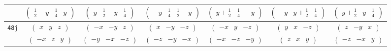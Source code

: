 \documentclass[fleqn,9pt,landscape]{jsarticle}
\begin{document}
\begin{center}
\begin{longtable}{ccccccc}
& $ \begin{pmatrix} \frac{1}{2} - y & \frac{1}{4} & y \end{pmatrix} $ & $ \begin{pmatrix} y & \frac{1}{2} - y & \frac{1}{4} \end{pmatrix} $ & $ \begin{pmatrix} - y & \frac{1}{4} & \frac{1}{2} - y \end{pmatrix} $ & $ \begin{pmatrix} y + \frac{1}{2} & \frac{1}{4} & - y \end{pmatrix} $ & $ \begin{pmatrix} - y & y + \frac{1}{2} & \frac{1}{4} \end{pmatrix} $ & $ \begin{pmatrix} y + \frac{1}{2} & y & \frac{1}{4} \end{pmatrix} $ \\ \hline
{\tt 48j} & $ \begin{pmatrix} x & y & z \end{pmatrix} $ & $ \begin{pmatrix} - x & - y & z \end{pmatrix} $ & $ \begin{pmatrix} x & - y & - z \end{pmatrix} $ & $ \begin{pmatrix} - x & y & - z \end{pmatrix} $ & $ \begin{pmatrix} y & x & - z \end{pmatrix} $ & $ \begin{pmatrix} z & - y & x \end{pmatrix} $ \\
& $ \begin{pmatrix} - x & z & y \end{pmatrix} $ & $ \begin{pmatrix} - y & - x & - z \end{pmatrix} $ & $ \begin{pmatrix} - z & - y & - x \end{pmatrix} $ & $ \begin{pmatrix} - x & - z & - y \end{pmatrix} $ & $ \begin{pmatrix} z & x & y \end{pmatrix} $ & $ \begin{pmatrix} - z & - x & y \end{pmatrix} $ \\

\end{longtable}
\end{center}
\end{document}
